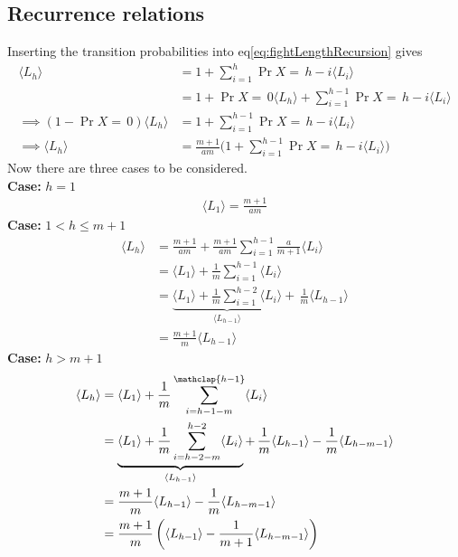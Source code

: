 \subsection{Recurrence relations}
Inserting the transition probabilities into eq\ref{eq:fightLengthRecursion} gives
\begin{align}
    \langle L_h \rangle
        &= 1 + \sum_{i=1}^h \Pr{X=\,h-i}\langle L_i\rangle\nonumber\\
        &= 1 + \Pr{X=\,0}\langle L_h \rangle + \sum_{i=1}^{h-1} \Pr{X=\,h-i}\langle L_i \rangle\nonumber\\
    \implies \left(1 - \Pr{X=\,0}\right)\langle L_h \rangle &= 1 + \sum_{i=1}^{h-1} \Pr{X=\,h-i}\langle L_i \rangle\nonumber\\
	\implies \langle L_h \rangle &= \frac{m+1}{am}\bigg(1 + \sum_{i=1}^{h-1} \Pr{X=\,h-i}\langle L_i \rangle\bigg)\label{eq:noregen1}
\end{align}
Now there are three cases to be considered.\\
\textbf{Case:} $h = 1$
\begin{align}
	\langle L_1 \rangle = \frac{m+1}{am}
\end{align}
\textbf{Case:} $1 < h \leq m+1$
\begin{align}
	\langle L_h \rangle
		&= \frac{m + 1}{am} + \frac{m+1}{am} \sum_{i=1}^{h-1}\frac{a}{m+1}\langle L_{i} \rangle\nonumber\\
		&= \langle L_{1} \rangle + \frac{1}{m} \sum_{i=1}^{h-1}\langle L_{i} \rangle\nonumber\\
		&= \underbrace{\langle L_{1} \rangle + \frac{1}{m} \sum_{i=1}^{h-2}\langle L_{i} \rangle}_{\langle L_{h-1}\rangle} +\,\frac{1}{m}\langle L_{h-1} \rangle\nonumber\\
		&= \frac{m+1}{m}\langle L_{h-1}\rangle\label{eq:geometricRecurrence}
\end{align}
\textbf{Case:} $h > m+1$
\begin{align}
    \langle L_h \rangle
        &= \langle L_{1} \rangle + \frac{1}{m}\sum_{i=h-1-m}^{\mathclap{h-1}} \langle L_i \rangle\nonumber\\
		&= \underbrace{\langle L_{1} \rangle + \frac{1}{m}\sum_{i=h-2-m}^{h-2} \langle L_i \rangle}_{\langle L_{h-1}\rangle} +\,\frac{1}{m}\langle L_{h-1} \rangle - \frac{1}{m}\langle L_{h-m-1} \rangle\nonumber\\
    	&= \frac{m+1}{m}\langle L_{h-1} \rangle - \frac{1}{m}\langle L_{h-m-1} \rangle\nonumber\\
		&= \frac{m+1}{m}\left(\langle L_{h-1} \rangle - \frac{1}{m+1}\langle L_{h-m-1} \rangle\right) \label{eq:complexRecurrence}
\end{align}

